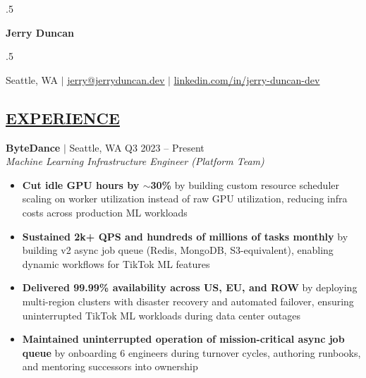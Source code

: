 \documentclass[overlapped,line,11pt]{res}
\begin{document}
\moveleft.5\hoffset\centerline{\huge\bf Jerry Duncan}
\vspace{.2em}
\moveleft.5\hoffset\centerline{Seattle, WA $|$ \href{mailto:jerry@jerryduncan.dev}{\uline{jerry@jerryduncan.dev}} $|$ \href{https://www.linkedin.com/in/jerry-duncan-dev}{\uline{linkedin.com/in/jerry-duncan-dev}}}
\vspace{0.5em}

\begin{resume}

\section{\underline{EXPERIENCE}}

\textbf{ByteDance} $|$ Seattle, WA \hfill Q3 2023 -- Present\\
{\sl Machine Learning Infrastructure Engineer (Platform Team)}
\begin{itemize} \itemsep 2pt
  \item \textbf{Cut idle GPU hours by $\sim$30\%} by building custom resource scheduler scaling on worker utilization instead of raw GPU utilization, reducing infra costs across production ML workloads
  \item \textbf{Sustained 2k+ QPS and hundreds of millions of tasks monthly} by building v2 async job queue (Redis, MongoDB, S3-equivalent), enabling dynamic workflows for TikTok ML features

  \item \textbf{Delivered 99.99\% availability across US, EU, and ROW} by deploying multi-region clusters with disaster recovery and automated failover, ensuring uninterrupted TikTok ML workloads during data center outages
  \item \textbf{Maintained uninterrupted operation of mission-critical async job queue} by onboarding 6 engineers during turnover cycles, authoring runbooks, and mentoring successors into ownership
\end{itemize}



\end{resume}
\end{document}
